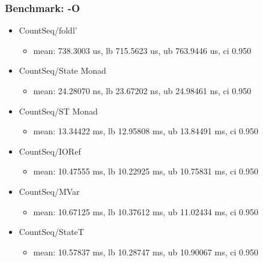 \begin{frame}\frametitle{Benchmark: -O}

\begin{itemize}
\item
  CountSeq/foldl'

  \begin{itemize}
  \item
    mean: 738.3003 us, lb 715.5623 us, ub 763.9446 us, ci 0.950
  \end{itemize}
\item
  CountSeq/State Monad

  \begin{itemize}
  \item
    mean: 24.28070 ns, lb 23.67202 ns, ub 24.98461 ns, ci 0.950
  \end{itemize}
\item
  CountSeq/ST Monad

  \begin{itemize}
  \item
    mean: 13.34422 ms, lb 12.95808 ms, ub 13.84491 ms, ci 0.950
  \end{itemize}
\item
  CountSeq/IORef

  \begin{itemize}
  \item
    mean: 10.47555 ms, lb 10.22925 ms, ub 10.75831 ms, ci 0.950
  \end{itemize}
\item
  CountSeq/MVar

  \begin{itemize}
  \item
    mean: 10.67125 ms, lb 10.37612 ms, ub 11.02434 ms, ci 0.950
  \end{itemize}
\item
  CountSeq/StateT

  \begin{itemize}
  \item
    mean: 10.57837 ms, lb 10.28747 ms, ub 10.90067 ms, ci 0.950
  \end{itemize}
\end{itemize}

\end{frame}

